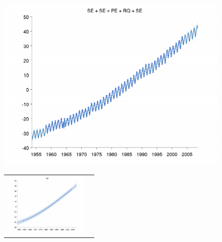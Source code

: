 \documentclass[twoside]{article}
\begin{document}
\begin{figure}[h!]
\begin{minipage}{\columnwidth}
\includegraphics[width=\columnwidth]{../figures/decomposition/mauna_test_all}
\label{fig:mauna_all}
\end{minipage}
\begin{minipage}{\columnwidth}
\centering
\newcommand{\fwmauna}{4cm}
\begin{tabular}{cc}
 \includegraphics[width=\fwmauna]{../figures/decomposition/mauna_test_1} & 

\end{tabular}
\end{minipage}
\end{figure}
\end{document}
